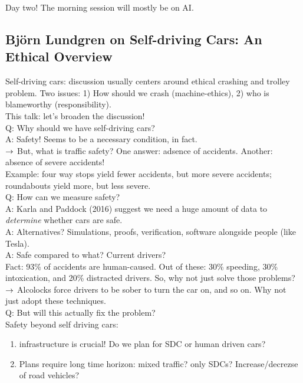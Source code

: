 Day two! The morning session will mostly be on AI.

\subsection{Bj{\" o}rn Lundgren on Self-driving Cars: An Ethical Overview}

Self-driving cars: discussion usually centers around ethical crashing and trolley problem. Two issues: 1) How should we crash (machine-ethics), 2) who is blameworthy (responsibility). \\

This talk: let's broaden the discussion! \\

Q: Why should we have self-driving cars? \\

A: Safety! Seems to be a necessary condition, in fact. \\

$\rightarrow$ But, what is traffic safety? One answer: adsence of accidents. Another: absence of severe accidents! \\

Example: four way stops yield fewer accidents, but more severe accidents; roundabouts yield more, but less severe. \\

Q: How can we measure safety? \\

A: Karla and Paddock (2016) suggest we need a huge amount of data to {\it determine} whether cars are safe. \\

A: Alternatives? Simulations, proofs, verification, software alongside people (like Tesla). \\

A: Safe compared to what? Current drivers? \\

Fact: 93\% of accidents are human-caused. Out of these: 30\% speeding, 30\% intoxication, and 20\% distracted drivers. So, why not just solve those problems? \\

$\rightarrow$ Alcolocks force drivers to be sober to turn the car on, and so on. Why not just adopt these techniques. \\

Q: But will this actually fix the problem? \\


Safety beyond self driving cars:
\begin{enumerate}
    \item infrastructure is crucial! Do we plan for SDC or human driven cars?
    \item Plans require long time horizon: mixed traffic? only SDCs? Increase/decrezse of road vehicles?
\end{enumerate}

